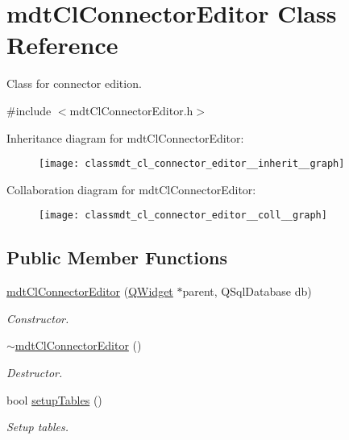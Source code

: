\hypertarget{classmdt_cl_connector_editor}{\section{mdt\-Cl\-Connector\-Editor Class Reference}
\label{classmdt_cl_connector_editor}
}


Class for connector edition.  




{\ttfamily \#include $<$mdt\-Cl\-Connector\-Editor.\-h$>$}



Inheritance diagram for mdt\-Cl\-Connector\-Editor\-:\nopagebreak
\begin{figure}[H]
\begin{center}
\leavevmode
\texttt{[image: classmdt\_cl\_connector\_editor\_\_inherit\_\_graph]}
\end{center}
\end{figure}


Collaboration diagram for mdt\-Cl\-Connector\-Editor\-:\nopagebreak
\begin{figure}[H]
\begin{center}
\leavevmode
\texttt{[image: classmdt\_cl\_connector\_editor\_\_coll\_\_graph]}
\end{center}
\end{figure}
\subsection*{Public Member Functions}
\begin{DoxyCompactItemize}
\item 
\hyperlink{classmdt_cl_connector_editor_a70a6435ff7845b4ce137c5c53adf31fc}{mdt\-Cl\-Connector\-Editor} (\hyperlink{class_q_widget}{Q\-Widget} $\ast$parent, Q\-Sql\-Database db)
\begin{DoxyCompactList}\small\item\em Constructor. \end{DoxyCompactList}\item 
\hyperlink{classmdt_cl_connector_editor_a5b6495a4ff8f57bd46feb1dcdce4860a}{$\sim$mdt\-Cl\-Connector\-Editor} ()
\begin{DoxyCompactList}\small\item\em Destructor. \end{DoxyCompactList}\item 
bool \hyperlink{classmdt_cl_connector_editor_a6f3fdb1041ec8d562aac777471b7892f}{setup\-Tables} ()
\begin{DoxyCompactList}\small\item\em Setup tables. \end{DoxyCompactList}\end{DoxyCompactItemize}
